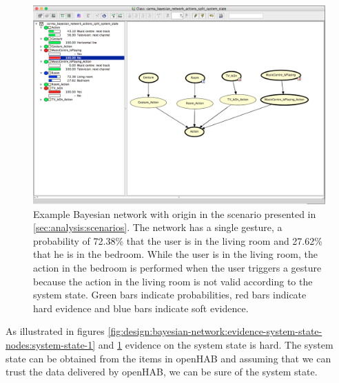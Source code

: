 \begin{figure}[h!]
\centering
\includegraphics[width=\textwidth]{images/bayesian-split-system-state-2}
\caption{Example Bayesian network with origin in the scenario presented in \cref{sec:analysis:scenarios}. The network has a single gesture, a probability of 72.38\% that the user is in the living room and 27.62\% that he is in the bedroom. While the user is in the living room, the action in the bedroom is performed when the user triggers a gesture because the action in the living room is not valid according to the system state. Green bars indicate probabilities, red bars indicate hard evidence and blue bars indicate soft evidence.}
\label{fig:design:bayesian-network:evidence-system-state-nodes:system-state-2}
\end{figure}

As illustrated in figures \ref{fig:design:bayesian-network:evidence-system-state-nodes:system-state-1} and \ref{fig:design:bayesian-network:evidence-system-state-nodes:system-state-2} evidence on the system state is hard. The system state can be obtained from the items in openHAB and assuming that we can trust the data delivered by openHAB, we can be sure of the system state.

